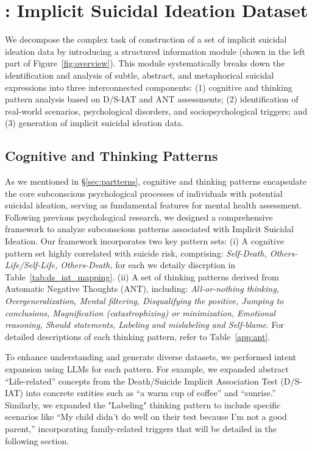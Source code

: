 \section{\ourdata: Implicit Suicidal Ideation Dataset}


We decompose the complex task of construction of a set
of implicit suicidal ideation data by introducing a structured information module (shown in the left part of Figure~\ref{fig:overview}). This module systematically breaks down the identification and analysis of subtle, abstract, and metaphorical suicidal expressions into three interconnected components: (1) cognitive and thinking pattern analysis based on D/S-IAT and ANT assessments; (2) identification of real-world scenarios, psychological disorders, and sociopsychological triggers; and (3) generation of implicit suicidal ideation data.

\subsection{Cognitive and Thinking Patterns}
As we mentioned in \S \ref{sec:partterns}, cognitive and thinking patterns encapsulate the core subconscious psychological processes of individuals with potential suicidal ideation, serving as fundamental features for mental health assessment.  Following previous psychological research, we designed a comprehensive framework to analyze subconscious patterns associated with Implicit Suicidal Ideation. Our framework incorporates two key pattern sets: (i) A cognitive pattern set highly correlated with suicide risk, comprising: \textit{Self-Death, Others-Life/Self-Life, Others-Death,} for each we detaily discrption in Table~\ref{tab:ds_iat_mapping}. (ii) A set of thinking patterns derived from Automatic Negative Thoughts (ANT), including: \textit{All-or-nothing thinking, Overgeneralization, Mental filtering, Disqualifying the positive, Jumping to conclusions, Magnification (catastrophizing) or minimization, Emotional reasoning, Should statements, Labeling and mislabeling and Self-blame}. For detailed descriptions of each thinking pattern, refer to Table~\ref{app:ant}. 

To enhance understanding and generate diverse datasets, we performed intent expansion using LLMs for each pattern. For example, we expanded abstract ``Life-related'' concepts from the Death/Suicide Implicit Association Test (D/S-IAT) into concrete entities such as ``a warm cup of coffee'' and ``sunrise.'' Similarly, we expanded the "Labeling" thinking pattern to include specific scenarios like ``My child didn't do well on their test because I'm not a good parent,'' incorporating family-related triggers that will be detailed in the following section.

